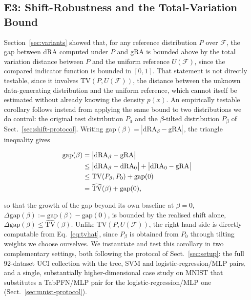 \documentclass[runningheads]{llncs}
\begin{document}
\subsection{E3: Shift-Robustness and the Total-Variation Bound}
\label{sec:e3}

Section~\ref{sec:variants} showed that, for any reference distribution $P$ over $\mathcal{F}$, the gap between dRA computed under $P$ and gRA is bounded above by the total variation distance between $P$ and the uniform reference $U(\mathcal{F})$, since the compared indicator function is bounded in $[0,1]$. That statement is not directly testable, since it involves $\mathrm{TV}(P, U(\mathcal{F}))$, the distance between the unknown data-generating distribution and the uniform reference, which cannot itself be estimated without already knowing the density $p(x)$. An empirically testable corollary follows instead from applying the same bound to two distributions we do control: the original test distribution $P_0$ and the $\beta$-tilted distribution $P_\beta$ of Sect.~\ref{sec:shift-protocol}. Writing $\mathrm{gap}(\beta) = |\mathrm{dRA}_\beta - \mathrm{gRA}|$, the triangle inequality gives

\begin{align}
  \mathrm{gap}(\beta) &= \bigl|\mathrm{dRA}_\beta - \mathrm{gRA}\bigr| \notag \\
  &\le \bigl|\mathrm{dRA}_\beta - \mathrm{dRA}_0\bigr| + \bigl|\mathrm{dRA}_0 - \mathrm{gRA}\bigr| \notag \\
  &\le \mathrm{TV}(P_\beta, P_0) + \mathrm{gap}(0) \notag \\
  &= \widehat{\mathrm{TV}}(\beta) + \mathrm{gap}(0), \label{eq:corollary}
\end{align}

so that the growth of the gap beyond its own baseline at $\beta=0$, $\Delta\mathrm{gap}(\beta) := \mathrm{gap}(\beta) - \mathrm{gap}(0)$, is bounded by the realised shift alone, $\Delta\mathrm{gap}(\beta) \le \widehat{\mathrm{TV}}(\beta)$. Unlike $\mathrm{TV}(P, U(\mathcal{F}))$, the right-hand side is directly computable from Eq.~\eqref{eq:tvhat}, since $P_\beta$ is obtained from $P_0$ through tilting weights we choose ourselves. We instantiate and test this corollary in two complementary settings, both following the protocol of Sect.~\ref{sec:setup}: the full 92-dataset UCI collection with the tree, SVM and logistic-regression/MLP pairs, and a single, substantially higher-dimensional case study on MNIST that substitutes a TabPFN/MLP pair for the logistic-regression/MLP one (Sect.~\ref{sec:mnist-protocol}).
\end{document}
